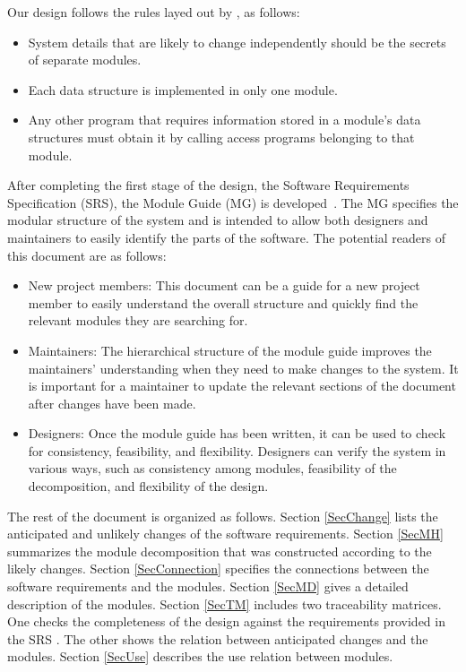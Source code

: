 \documentclass[12pt, titlepage]{article}
\begin{document}
Our design follows the rules layed out by \citet{ParnasEtAl1984}, as follows:
\begin{itemize}
\item System details that are likely to change independently should be the
  secrets of separate modules.
\item Each data structure is implemented in only one module.
\item Any other program that requires information stored in a module's data
  structures must obtain it by calling access programs belonging to that module.
\end{itemize}

After completing the first stage of the design, the Software Requirements
Specification (SRS), the Module Guide (MG) is developed~\citep{ParnasEtAl1984}. The MG
specifies the modular structure of the system and is intended to allow both
designers and maintainers to easily identify the parts of the software.  The
potential readers of this document are as follows:

\begin{itemize}
\item New project members: This document can be a guide for a new project member
  to easily understand the overall structure and quickly find the
  relevant modules they are searching for.
\item Maintainers: The hierarchical structure of the module guide improves the
  maintainers' understanding when they need to make changes to the system. It is
  important for a maintainer to update the relevant sections of the document
  after changes have been made.
\item Designers: Once the module guide has been written, it can be used to
  check for consistency, feasibility, and flexibility. Designers can verify the
  system in various ways, such as consistency among modules, feasibility of the
  decomposition, and flexibility of the design.
\end{itemize}

The rest of the document is organized as follows. Section
\ref{SecChange} lists the anticipated and unlikely changes of the software
requirements. Section \ref{SecMH} summarizes the module decomposition that
was constructed according to the likely changes. Section \ref{SecConnection}
specifies the connections between the software requirements and the
modules. Section \ref{SecMD} gives a detailed description of the
modules. Section \ref{SecTM} includes two traceability matrices. One checks
the completeness of the design against the requirements provided in the SRS \citep{SRS}.
The other shows the relation between anticipated changes and the modules. Section
\ref{SecUse} describes the use relation between modules.
\end{document}
